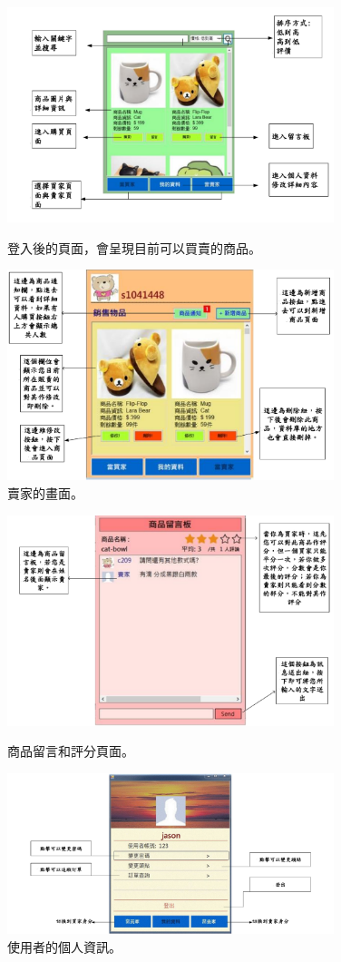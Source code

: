 \documentclass{scrreprt}
\begin{document}
\begin{CJK}{UTF8}{bkai}
\begin{figure}[t]
	\centering
	\includegraphics[width=0.85\textwidth]{search.pdf}
	\caption{登入後的頁面，會呈現目前可以買賣的商品。}
	\centering
	\includegraphics[width=0.85\textwidth]{note.pdf}
	\caption{賣家的畫面。}
\end{figure}

\begin{figure}[t]
	\centering
	\includegraphics[width=0.85\textwidth]{star.pdf}
	\caption{商品留言和評分頁面。}
	\centering
	\includegraphics[width=0.85\textwidth]{Info.pdf}
	\caption{使用者的個人資訊。}
\end{figure}


\end{CJK}
\end{document}
